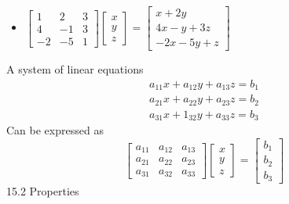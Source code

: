 \documentclass[]{article}
\begin{document}
\begin{itemize}
			\item $\begin{bmatrix}{1}&{2}&{3}\\{4}&{-1}&{3}\\{-2}&{-5}&{1}\end{bmatrix}\begin{bmatrix}{x}\\{y}\\{z}\end{bmatrix}=\begin{bmatrix}{x+2y}\\{4x-y+3z}\\{-2x-5y+z}\end{bmatrix}$
		\end{itemize}
		A system of linear equations
		\begin{align}
			a_{11}x+a_{12}y+a_{13}z=b_1\\
			a_{21}x+a_{22}y+a_{23}z=b_2\\
			a_{31}x+1_{32}y+a_{33}z=b_3
		\end{align}
		Can be expressed as
		$$
			\begin{bmatrix}
				{a_{11}}&{a_{12}}&{a_{13}}\\
				{a_{21}}&{a_{22}}&{a_{23}}\\
				{a_{31}}&{a_{32}}&{a_{33}}
			\end{bmatrix}
			\begin{bmatrix}
				{x}\\
				{y}\\
				{z}
			\end{bmatrix}=
			\begin{bmatrix}
				{b_1}\\
				{b_2}\\
				{b_3}
			\end{bmatrix}
		$$
		\large{15.2 Properties}
		\normalsize
\end{document}

